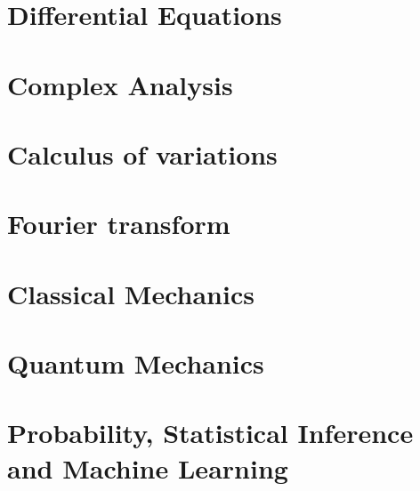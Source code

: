 \documentclass{book}
\begin{document}
\chapter{Differential Equations}


\chapter{Complex Analysis}




\chapter{Calculus of variations}


\chapter{Fourier transform}


\chapter{Classical Mechanics}







\chapter{Quantum Mechanics}


\chapter{Probability, Statistical Inference and Machine Learning}




\end{document}

